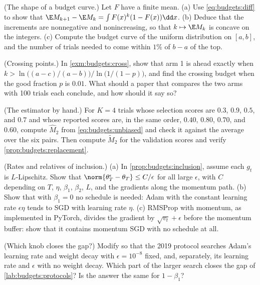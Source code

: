 \begin{refsection}
\begin{exercises}
\item \consolidation (The shape of a budget curve.) Let $F$ have a finite mean. (a) Use \eqref{eq:budgets:diff} to show that $\E M_{k+1}-\E M_k=\int F(x)^k(1-F(x))\dd x$. (b) Deduce that the increments are nonnegative and nonincreasing, so that $k\mapsto\E M_k$ is concave on the integers. (c) Compute the budget curve of the uniform distribution on $[a,b]$, and the number of trials needed to come within $1\%$ of $b-a$ of the top.\label{ex:budgets:shape}

\item \consolidation (Crossing points.) In \cref{exm:budgets:cross}, show that arm 1 is ahead exactly when $k>\ln\bigl((a-c)/(a-b)\bigr)/\ln\bigl(1/(1-p)\bigr)$, and find the crossing budget when the good fraction $p$ is $0.01$. What should a paper that compares the two arms with 100 trials each conclude, and how should it say so?\label{ex:budgets:crossing}

\item \consolidation (The estimator by hand.) For $K=4$ trials whose selection scores are $0.3$, $0.9$, $0.5$, and $0.7$ and whose reported scores are, in the same order, $0.40$, $0.80$, $0.70$, and $0.60$, compute $\hat M_2$ from \eqref{eq:budgets:unbiased} and check it against the average over the six pairs. Then compute $\tilde M_2$ for the validation scores and verify \cref{prop:budgets:replacement}.\label{ex:budgets:byhand}

\item \consolidation\hard (Rates and relatives of inclusion.) (a) In \cref{prop:budgets:inclusion}, assume each $g_t$ is $L$-Lipschitz. Show that $\norm{\theta_T^\epsilon-\theta_T}\le C/\epsilon$ for all large $\epsilon$, with $C$ depending on $T$, $\eta$, $\beta_1$, $\beta_2$, $L$, and the gradients along the momentum path. (b) Show that with $\beta_1=0$ no schedule is needed: Adam with the constant learning rate $\epsilon\eta$ tends to SGD with learning rate $\eta$. (c) RMSProp with momentum, as implemented in PyTorch, divides the gradient by $\sqrt{v_t}+\epsilon$ before the momentum buffer: show that it contains momentum SGD with no schedule at all. \label{ex:budgets:rate}

\item \labwork (Which knob closes the gap?)\label{ex:budgets:which} Modify  so that the 2019 protocol searches Adam's learning rate and weight decay with $\epsilon=10^{-8}$ fixed, and, separately, its learning rate and $\epsilon$ with no weight decay. Which part of the larger search closes the gap of \cref{lab:budgets:protocols}? Is the answer the same for $1-\beta_1$?


\end{exercises}
\end{refsection}

